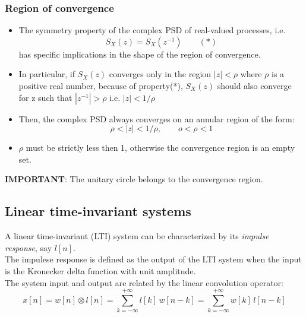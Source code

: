 \subsubsection{Region of convergence}
\begin{itemize}
     \item The symmetry property of the complex PSD of real-valued processes, i.e.
\[
S_X(z)=S_X(z^{-1}) \qquad(*)
\]
     has specific implications in the shape of the region of convergence.
     \item In particular, if \(S_X(z)\) converges only in the region \(|z|<\rho\) where \(\rho\) is a positive real number, because of property(*), \(S_X(z)\) should also converge for z such that \(|z^{-1}|>\rho\) i.e. \(|z|<1/\rho\)
     \item Then, the complex PSD always converges on an annular region of the form:
     \[
     \rho<|z|<1/\rho, \qquad o<\rho<1
     \]
     \item \(\rho\) must be strictly less then 1, otherwise the convergence region is an empty set.
     
\end{itemize}
\noindent\textbf{IMPORTANT}: The unitary circle belongs to the convergence region.
\subsection{Linear time-invariant systems}
A linear time-invariant (LTI) system can be characterized by its \textit{impulse response}, say \(l[n]\).\\
The impulese response is defined as the output of the LTI system when the input is the Kronecker delta function with unit amplitude.\\
The system input and output are related by the linear convolution operator:
\[
x[n] = w[n] \otimes l[n] = \sum_{k=-\infty}^{+\infty} l[k]\,w[n-k] = \sum_{k=-\infty}^{+\infty} w[k]\,l[n-k]
\]

